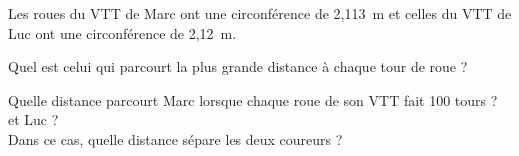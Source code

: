 Les roues du VTT de Marc ont une circonférence de 2,113~m et celles
du VTT de Luc ont une circonférence de 2,12~m.
\begin{myenumerate}
\item Quel est celui qui parcourt la plus grande distance à chaque
tour de roue ?
\item Quelle distance parcourt Marc lorsque chaque roue de son VTT
fait 100 tours ? et Luc ?\\Dans ce cas, quelle distance sépare les
deux coureurs ?
\end{myenumerate}